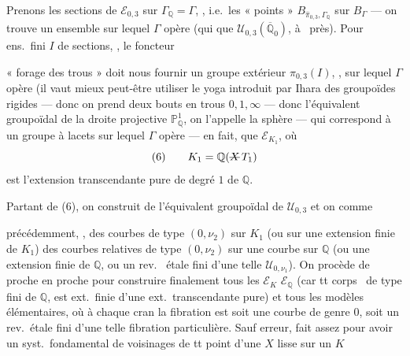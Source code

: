 \documentclass[11pt,a4paper]{article}
\begin{document}
Prenons les  sections de $\mathcal{E}_{0,3}$ sur $\Gamma_{\mathbb{Q}} = \Gamma$,  \add{\uncertain{(\ill{} \ill{})}}, i.e.\ les « points »   $B_{\widehat{\pi}_{0,3}, \Gamma_{\mathbb{Q}}}$ \ill{} sur $B_{\Gamma}$ --- on trouve un ensemble sur lequel $\Gamma$ opère (qui \ill{} \ill{} que $\mathcal{U}_{0,3}(\overline{\mathbb{Q}}_0)$, à \ près). Pour  ens.\ fini $I$ de sections, , le foncteur


« forage des trous » doit nous fournir un groupe extérieur $\pi_{0,3}(I)$, , sur lequel $\Gamma$ opère (il vaut mieux peut-être utiliser le yoga introduit par Ihara des groupoïdes rigides --- donc on prend deux  bouts  en trous $0, 1, \infty$ --- \ill{} donc l'équivalent groupoïdal de la  droite projective $\mathbb{P}^1_{\mathbb{Q}}$, on l'appelle la sphère  --- qui correspond à un groupe  à lacets  sur lequel $\Gamma$ opère --- en fait,  que $\mathcal{E}_{K_1}$, où
\[
(6)\qquad K_1 = \mathbb{Q}(\text{\struck{$X$}}\, T_1)
\]
est l'extension transcendante pure  de degré $1$ de $\mathbb{Q}$.

Partant de (6), on construit de  l'équivalent groupoïdal de \struck{\ill{}} $\mathcal{U}_{0,3}$ \struck{(\ill{}} et on  comme

précédemment, ,  des courbes de type $(0, \nu_2)$ sur $K_1$ (ou sur une extension finie de $K_1$)  des courbes relatives de type $(0, \nu_2)$ sur une courbe sur $\mathbb{Q}$  (ou une extension finie de $\mathbb{Q}$, ou un rev.\  étale fini d'une telle $\mathcal{U}_{0,\nu_1}$).
On procède de proche en proche pour construire finalement tous les $\mathcal{E}_K$  $\mathcal{E}_{\mathbb{Q}}$ (car tt corps \ de type fini de $\mathbb{Q}$, est ext.\ finie d'une ext.\ transcendante pure) et tous les modèles élémentaires, où à chaque cran la fibration est soit une courbe de genre $0$, soit un rev.\ étale fini d'une telle fibration particulière. Sauf erreur,  fait assez pour avoir un syst.\ fondamental de voisinages de tt point d'une $X$ lisse sur un $K$
\end{document}
